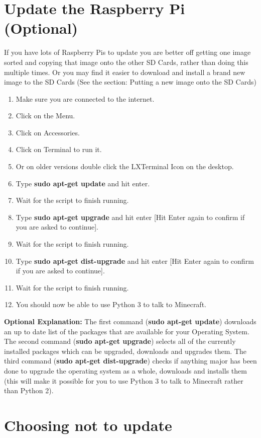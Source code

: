 \documentclass{geocraft-worksheet-multipage}
\begin{document}
\section*{Update the Raspberry Pi (Optional)}
If you have lots of Raspberry Pis to update you are better off getting
one image sorted and copying that image onto the other SD Cards,
rather than doing this multiple times. Or you may find it easier to
download and install a brand new image to the SD Cards (See the
section: Putting a new image onto the SD Cards)
\begin{enumerate}
\item Make sure you are connected to the internet.
\item Click on the Menu.
\item Click on Accessories.
\item Click on Terminal to run it.
\item Or on older versions double click the LXTerminal Icon on the desktop.
\item Type \textbf{sudo apt-get update} and hit enter.
\item Wait for the script to finish running.
\item Type \textbf{sudo apt-get upgrade} and hit enter [Hit Enter
  again to confirm if you are asked to continue].
\item Wait for the script to finish running.
\item Type \textbf{sudo apt-get dist-upgrade} and hit enter [Hit Enter
  again to confirm if you are asked to continue]. 
\item Wait for the script to finish running.
\item You should now be able to use Python 3 to talk to Minecraft.
\end{enumerate}

\textbf{Optional Explanation:} The first command (\textbf{sudo apt-get update})
downloads an up to date list of the packages that are available for
your Operating System. The second command (\textbf{sudo apt-get
  upgrade}) selects all of the currently installed packages which can 
be upgraded, downloads and upgrades them. The third command
(\textbf{sudo apt-get dist-upgrade}) checks if anything major has been 
done to upgrade the operating system as a whole, downloads and
installs them (this will make it possible for you to use Python 3 to
talk to Minecraft rather than Python 2).

\section*{Choosing not to update}
\end{document}
